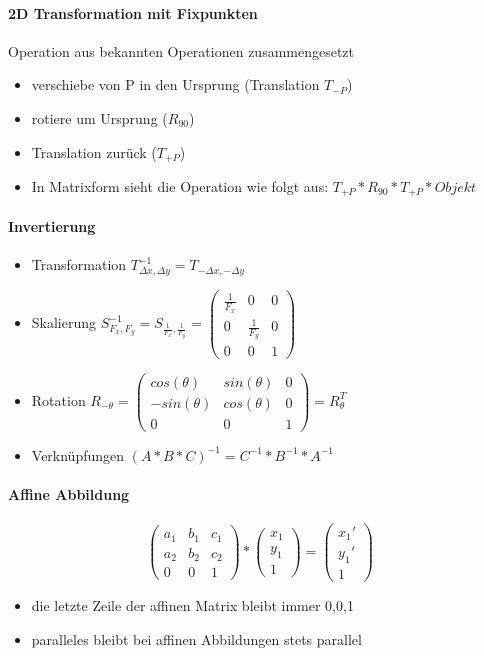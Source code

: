 \documentclass[10pt,landscape]{article}
\begin{document}
\begin{multicols}{3}
\paragraph*{2D Transformation mit Fixpunkten}
Operation aus bekannten Operationen zusammengesetzt
\begin{itemize}
    \item verschiebe von P in den Ursprung (Translation $T_{-P}$)
    \item rotiere um Ursprung ($R_{90}$)
    \item Translation zurück ($T_{+P}$)
    \item In Matrixform sieht die Operation wie folgt aus: $T_{+P}*R_{90}*T_{+P}*{Objekt}$
\end{itemize}

\paragraph*{Invertierung}
\begin{itemize}
    \item Transformation  $T_{\Delta x, \Delta y}^{-1} = T_{-\Delta x, -\Delta y}$
    \item Skalierung $S_{F_x, F_y}^{-1}=S_{\frac{1}{F_x},\frac{1}{F_y}}=\begin{pmatrix} \frac{1}{F_x} &0&0\\ 0&\frac{1}{F_y}&0\\ 0&0&1 \end{pmatrix}$
    \item Rotation $R_{-\theta} = \begin{pmatrix} cos(\theta) & sin(\theta) & 0 \\ -sin(\theta) & cos(\theta) & 0 \\ 0 & 0 & 1 \end{pmatrix} = R_{\theta}^{T}$
    \item Verknüpfungen $(A*B*C)^{-1}=C^{-1}*B^{-1}*A^{-1}$
\end{itemize}

\paragraph{Affine Abbildung}
$$\begin{pmatrix}a_1 & b_1 & c_1\\a_2 &b_2 & c_2\\ 0&0&1\end{pmatrix}*\begin{pmatrix} x_1\\y_1\\1\end{pmatrix}= \begin{pmatrix}x_1'\\y_1'\\1 \end{pmatrix}$$
\begin{itemize}
  \item die letzte Zeile der affinen Matrix bleibt immer 0,0,1
  \item paralleles bleibt bei affinen Abbildungen stets parallel
\end{itemize}


\end{multicols}
\end{document}
